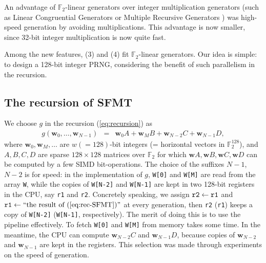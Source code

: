 \documentclass{svmult}
\def\F2{{\mathbb F}_2}
\def\bw{{{\mathbf w}}}
\begin{document}
An advantage of $\F2$-linear generators 
over integer multiplication generators 
(such as Linear Congruential Generators \cite{knuth:bible}
or Multiple Recursive Generators \cite{MRG})
was high-speed generation by avoiding multiplications.
This advantage is now smaller, since 
32-bit integer multiplication is now quite fast. 

Among the new features,
(3) and (4) fit $\F2$-linear generators. 
Our idea is simple: to design
a 128-bit integer PRNG, considering
the benefit of such parallelism in the recursion.

\subsection{The recursion of SFMT}
We choose $g$ in the recursion (\ref{eq:recursion}) as
\begin{eqnarray}\label{eq:rec-SFMT}
g(\bw_0,\ldots,\bw_{N-1}) 
&=& \bw_0A + \bw_MB + \bw_{N-2}C + \bw_{N-1}D,
\end{eqnarray}
where 
$\bw_0, \bw_M, \ldots$ are $w(=128)$-bit integers 
(= horizontal vectors in $\F2^{128}$),
and $A, B, C, D$ are sparse $128 \times 128$ matrices
over $\F2$ for which 
$\bw A, \bw B, \bw C, \bw D$ can be computed by
a few SIMD bit-operations.
The choice of the suffixes $N-1$, $N-2$ is for  
speed: in the implementation of $g$, 
{\tt W[0]} and {\tt W[M]} are read from the array
{\tt W}, while the copies of 
{\tt W[N-2]} and {\tt W[N-1]}
are kept in 
two 128-bit registers in the CPU, 
say {\tt r1} and {\tt r2}. Concretely speaking, we assign 
${\tt r2} \leftarrow {\tt r1}$ and
${\tt r1} \leftarrow \mbox{``the result of (\ref{eq:rec-SFMT})''}$
at every generation, then {\tt r2} ({\tt r1}) keeps
a copy of {\tt W[N-2]} ({\tt W[N-1]}, respectively). 
The merit of doing this is to use the pipeline effectively. To fetch 
{\tt W[0]} and {\tt W[M]} from memory takes some
time. In the meantime, the
CPU can compute $\bw_{N-2}C$ and $\bw_{N-1}D$,
because copies of $\bw_{N-2}$ and $\bw_{N-1}$ are kept 
in the registers. This selection was made through experiments
on the speed of generation.
\end{document}
